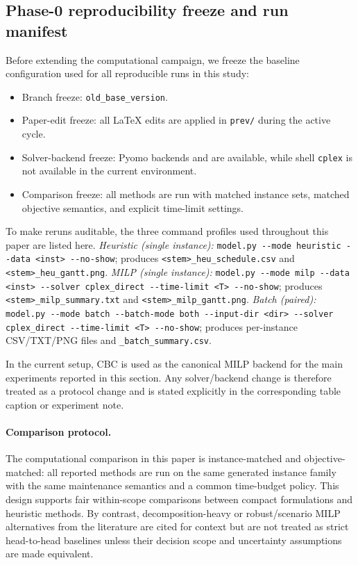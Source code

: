 \subsection{Phase-0 reproducibility freeze and run manifest}
\label{subsec:phase0_freeze}

Before extending the computational campaign, we freeze the baseline
configuration used for all reproducible runs in this study:
\begin{itemize}
  \item Branch freeze: \texttt{old\_base\_version}.
  \item Paper-edit freeze: all \LaTeX{} edits are applied in
    \texttt{prev/} during the active cycle.
  \item Solver-backend freeze: Pyomo backends
     and  are available,
    while shell \texttt{cplex} is not available in the current environment.
  \item Comparison freeze: all methods are run with matched instance sets,
    matched objective semantics, and explicit time-limit settings.
\end{itemize}

To make reruns auditable, the three command profiles used throughout this
paper are listed here.  \emph{Heuristic (single instance):}
\texttt{model.py -{}-mode heuristic -{}-data <inst> -{}-no-show};
produces \texttt{<stem>\_heu\_schedule.csv} and \texttt{<stem>\_heu\_gantt.png}.
\emph{MILP (single instance):}
\texttt{model.py -{}-mode milp -{}-data <inst> -{}-solver cplex\_direct
-{}-time-limit <T> -{}-no-show};
produces \texttt{<stem>\_milp\_summary.txt} and
\texttt{<stem>\_milp\_gantt.png}.
\emph{Batch (paired):}
\texttt{model.py -{}-mode batch -{}-batch-mode both -{}-input-dir <dir>
-{}-solver cplex\_direct -{}-time-limit <T> -{}-no-show};
produces per-instance CSV/TXT/PNG files and \texttt{\_batch\_summary.csv}.

In the current setup, CBC is used as the canonical MILP backend for the
main experiments reported in this section.  Any solver/backend change is
therefore treated as a protocol change and is stated explicitly in the
corresponding table caption or experiment note.

\paragraph{Comparison protocol.}
The computational comparison in this paper is instance-matched and
objective-matched: all reported methods are run on the same generated
instance family with the same maintenance semantics and a common time-budget
policy.  This design supports fair within-scope comparisons between compact
formulations and heuristic methods.  By contrast, decomposition-heavy or
robust/scenario MILP alternatives from the literature are cited for context
but are not treated as strict head-to-head baselines unless their decision
scope and uncertainty assumptions are made equivalent.

